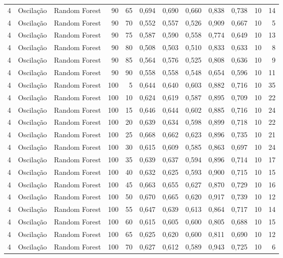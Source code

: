 \begin{longtable}{@{}rllrrrrrrrrr@{}}
4 & Oscilação & Random Forest & 90 & 65 & 0,694 & 0,690 & 0,660 & 0,838 & 0,738 & 10 & 14 \\
4 & Oscilação & Random Forest & 90 & 70 & 0,552 & 0,557 & 0,526 & 0,909 & 0,667 & 10 & 5 \\
4 & Oscilação & Random Forest & 90 & 75 & 0,587 & 0,590 & 0,558 & 0,774 & 0,649 & 10 & 13 \\
4 & Oscilação & Random Forest & 90 & 80 & 0,508 & 0,503 & 0,510 & 0,833 & 0,633 & 10 & 8 \\
4 & Oscilação & Random Forest & 90 & 85 & 0,564 & 0,576 & 0,525 & 0,808 & 0,636 & 10 & 9 \\
4 & Oscilação & Random Forest & 90 & 90 & 0,558 & 0,558 & 0,548 & 0,654 & 0,596 & 10 & 11 \\
4 & Oscilação & Random Forest & 100 & 5 & 0,644 & 0,640 & 0,603 & 0,882 & 0,716 & 10 & 35 \\
4 & Oscilação & Random Forest & 100 & 10 & 0,624 & 0,619 & 0,587 & 0,895 & 0,709 & 10 & 22 \\
4 & Oscilação & Random Forest & 100 & 15 & 0,646 & 0,644 & 0,602 & 0,885 & 0,716 & 10 & 24 \\
4 & Oscilação & Random Forest & 100 & 20 & 0,639 & 0,634 & 0,598 & 0,899 & 0,718 & 10 & 22 \\
4 & Oscilação & Random Forest & 100 & 25 & 0,668 & 0,662 & 0,623 & 0,896 & 0,735 & 10 & 21 \\
4 & Oscilação & Random Forest & 100 & 30 & 0,615 & 0,609 & 0,585 & 0,863 & 0,697 & 10 & 24 \\
4 & Oscilação & Random Forest & 100 & 35 & 0,639 & 0,637 & 0,594 & 0,896 & 0,714 & 10 & 17 \\
4 & Oscilação & Random Forest & 100 & 40 & 0,632 & 0,625 & 0,593 & 0,900 & 0,715 & 10 & 15 \\
4 & Oscilação & Random Forest & 100 & 45 & 0,663 & 0,655 & 0,627 & 0,870 & 0,729 & 10 & 16 \\
4 & Oscilação & Random Forest & 100 & 50 & 0,670 & 0,665 & 0,620 & 0,917 & 0,739 & 10 & 12 \\
4 & Oscilação & Random Forest & 100 & 55 & 0,647 & 0,639 & 0,613 & 0,864 & 0,717 & 10 & 14 \\
4 & Oscilação & Random Forest & 100 & 60 & 0,615 & 0,605 & 0,600 & 0,805 & 0,688 & 10 & 15 \\
4 & Oscilação & Random Forest & 100 & 65 & 0,625 & 0,620 & 0,600 & 0,811 & 0,690 & 10 & 12 \\
4 & Oscilação & Random Forest & 100 & 70 & 0,627 & 0,612 & 0,589 & 0,943 & 0,725 & 10 & 6 \\

\end{longtable}
